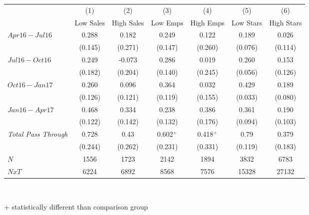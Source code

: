 \begin{center}
\begin{tabular}{lcccccc}
\hline  & (1) & (2) & (3) & (4) & (5) & (6)\\
 & Low Sales & High Sales & Low Emps & High Emps & Low Stars & High Stars\\
\hline  $ Apr16-Jul16 $  & 0.288 & 0.182 & 0.249 & 0.122 & 0.189 & 0.026\\
 & (0.145) & (0.271) & (0.147) & (0.260) & (0.076) & (0.114)\\
 $ Jul16-Oct16 $  & 0.249 & -0.073 & 0.286 & 0.019 & 0.260 & 0.153\\
 & (0.182) & (0.204) & (0.140) & (0.245) & (0.056) & (0.126)\\
 $ Oct16-Jan17 $  & 0.260 & 0.096 & 0.364 & 0.032 & 0.429 & 0.189\\
 & (0.126) & (0.121) & (0.119) & (0.155) & (0.033) & (0.080)\\
 $ Jan16-Apr17 $  & 0.468 & 0.334 & 0.238 & 0.386 & 0.361 & 0.190\\
 & (0.122) & (0.142) & (0.132) & (0.176) & (0.094) & (0.103)\\
\hline \textit{Total Pass Through} & 0.728 & 0.43 & 0.602$^+$ & 0.418$^+$ & 0.79 & 0.379\\
  & (0.244) & (0.262) & (0.231) & (0.331) & (0.119) & (0.183)\\
\hline  $ N $  & 1556 & 1723 & 2142 & 1894 & 3832 & 6783\\
 $ NxT $  & 6224 & 6892 & 8568 & 7576 & 15328 & 27132\\
\hline\end{tabular}\\
\begin{tiny} + statistically different than comparison group \end{tiny}\\
\end{center}
